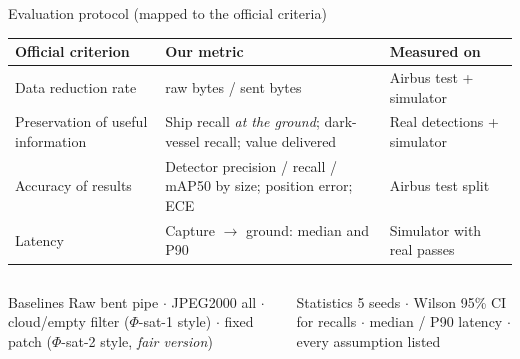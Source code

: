 \documentclass[aspectratio=169,10pt]{beamer}
\begin{document}
\begin{frame}{Evaluation protocol (mapped to the official criteria)}
\footnotesize
\renewcommand{\arraystretch}{1.2}
\begin{tabularx}{\textwidth}{@{}P{3.4cm} L P{3.6cm}@{}}
\toprule
\textbf{Official criterion} & \textbf{Our metric} & \textbf{Measured on} \\
\midrule
Data reduction rate & raw bytes / sent bytes & Airbus test + simulator \\
Preservation of useful information & Ship recall \emph{at the ground}; dark-vessel recall; value delivered & Real detections + simulator \\
Accuracy of results & Detector precision / recall / mAP50 by size; position error; ECE & Airbus test split \\
Latency & Capture $\rightarrow$ ground: median and P90 & Simulator with real passes \\
\bottomrule
\end{tabularx}
\vspace{2mm}
\begin{columns}[T]
\begin{block}{Baselines}
\footnotesize Raw bent pipe $\cdot$ JPEG2000 all $\cdot$ cloud/empty filter ($\Phi$-sat-1 style) $\cdot$ fixed patch ($\Phi$-sat-2 style, \emph{fair version})
\end{block}
\begin{block}{Statistics}
\footnotesize 5 seeds $\cdot$ Wilson 95\% CI for recalls $\cdot$ median / P90 latency $\cdot$ every assumption listed
\end{block}
\end{columns}
\end{frame}
\end{document}
